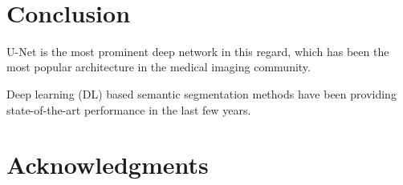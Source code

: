 \documentclass[UTF8]{article} %
\begin{document}
~\\

\section{Conclusion}\label{sec:conc}
U-Net is the most prominent deep network in this regard,
which has been the most popular architecture in the medical imaging community.


Deep learning (DL) based semantic segmentation methods have been providing state-of-the-art performance in the last few years.



\section*{Acknowledgments}
~\\
~\\




\end{document}
